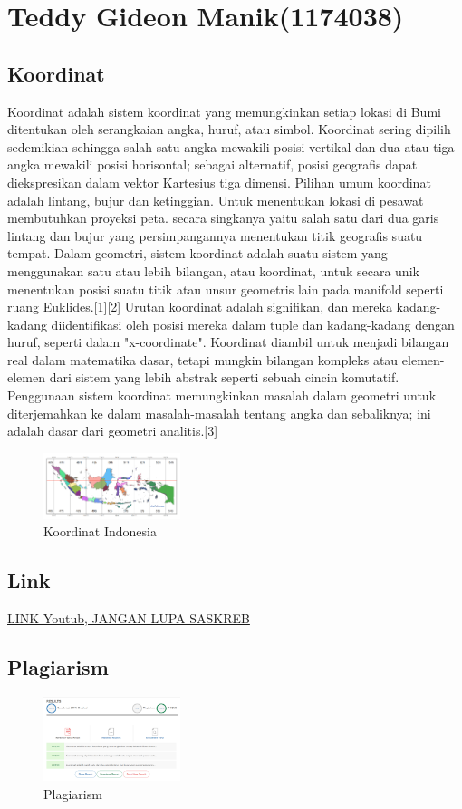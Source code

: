 \section{Teddy Gideon Manik(1174038)}

\subsection{Koordinat}
\par
Koordinat adalah sistem koordinat yang memungkinkan setiap lokasi di Bumi ditentukan oleh serangkaian angka, huruf, atau simbol. Koordinat sering dipilih sedemikian sehingga salah satu angka mewakili posisi vertikal dan dua atau tiga angka mewakili posisi horisontal; sebagai alternatif, posisi geografis dapat diekspresikan dalam vektor Kartesius tiga dimensi. Pilihan umum koordinat adalah lintang, bujur dan ketinggian. Untuk menentukan lokasi di pesawat membutuhkan proyeksi peta. secara singkanya yaitu salah satu dari dua garis lintang dan bujur yang persimpangannya menentukan titik geografis suatu tempat.
Dalam geometri, sistem koordinat adalah suatu sistem yang menggunakan satu atau lebih bilangan, atau koordinat, untuk secara unik menentukan posisi suatu titik atau unsur geometris lain pada manifold seperti ruang Euklides.[1][2] Urutan koordinat adalah signifikan, dan mereka kadang-kadang diidentifikasi oleh posisi mereka dalam tuple dan kadang-kadang dengan huruf, seperti dalam "x-coordinate". Koordinat diambil untuk menjadi bilangan real dalam matematika dasar, tetapi mungkin bilangan kompleks atau elemen-elemen dari sistem yang lebih abstrak seperti sebuah cincin komutatif. Penggunaan sistem koordinat memungkinkan masalah dalam geometri untuk diterjemahkan ke dalam masalah-masalah tentang angka dan sebaliknya; ini adalah dasar dari geometri analitis.[3]


\begin{figure}[H]
	\includegraphics[width=4cm]{figures/1174038/peta koordinat indonesia.png}
	\centering
	\caption{Koordinat Indonesia}
\end{figure}

\subsection{Link}
\href{https://https://youtu.be/gIAfrXKGDCI}{LINK Youtub, JANGAN LUPA SASKREB}
\subsection{Plagiarism}
\begin{figure}[H]
	\includegraphics[width=4cm]{figures/1174038/plagiarism.png}
	\centering
	\caption{Plagiarism}
\end{figure}